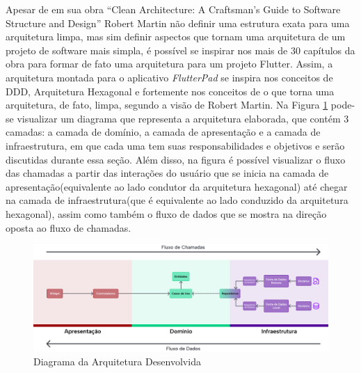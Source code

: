 \documentclass[12pt, %
openright, 
oneside, %
a4paper,    %
brazil]{facom-ufu-abntex2}
\begin{document}
Apesar de em sua obra ``Clean Architecture: A Craftsman's Guide to Software Structure and Design'' Robert Martin não definir uma estrutura exata para uma arquitetura limpa, mas sim definir aspectos que tornam uma arquitetura de um projeto de software mais simpla, é possível se inspirar nos mais de 30 capítulos da obra para formar de fato uma arquitetura para um projeto Flutter. Assim, a arquitetura montada para o aplicativo \textit{FlutterPad} se inspira nos conceitos de DDD, Arquitetura Hexagonal e fortemente nos conceitos de o que torna uma arquitetura, de fato, limpa, segundo a visão de Robert Martin. Na Figura \ref{fig:arch_diagram} pode-se visualizar um diagrama que representa a arquitetura elaborada, que contém 3 camadas: a camada de domínio, a camada de apresentação e a camada de infraestrutura, em que cada uma tem suas responsabilidades e objetivos e serão discutidas durante essa seção. Além disso, na figura é possível visualizar o fluxo das chamadas a partir das interações do usuário que se inicia na camada de apresentação(equivalente ao lado condutor da arquitetura hexagonal) até chegar na camada de infraestrutura(que é equivalente ao lado conduzido da arquitetura hexagonal), assim como também o fluxo de dados que se mostra na direção oposta ao fluxo de chamadas.

\begin{figure}[ht]
    \centering
    \includegraphics[width=1\textwidth]{figures/arch/arch_diagram.png}
    \caption{Diagrama da Arquitetura Desenvolvida}
    \label{fig:arch_diagram}
\end{figure}
\end{document}
